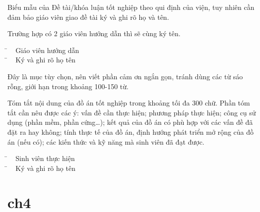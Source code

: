 \documentclass[12pt,twoside]{report}
\begin{document}
\coverpage

\begin{detai}

Biểu mẫu của Đề tài/khóa luận tốt nghiệp theo qui định của viện, tuy nhiên cần đảm bảo giáo viên giao đề tài ký và ghi rõ họ và tên.

Trường hợp có 2 giáo viên hướng dẫn thì sẽ cùng ký tên. \\
\vspace{14cm}
\begin{tabbing}
\hspace{9cm}\=\kill
 ~ \> {\large Giáo viên hướng dẫn}\\
 \hspace{9.5cm}\=\kill
 ~ \> Ký và ghi rõ họ tên
\end{tabbing} 
\end{detai}

\begin{acknowledgments}
Đây là mục tùy chọn, nên viết phần cảm ơn ngắn gọn, tránh dùng các từ sáo rỗng, giới hạn trong khoảng 100-150 từ.
\end{acknowledgments}

\begin{declaration}
Tóm tắt nội dung của đồ án tốt nghiệp trong khoảng tối đa 300 chữ. Phần tóm tắt cần nêu được các ý: vấn đề cần thực hiện; phương pháp thực hiện; công cụ sử dụng (phần mềm, phần cứng…); kết quả của đồ án có phù hợp với các vấn đề đã đặt ra hay không; tính thực tế của đồ án, định hướng phát triển mở rộng của đồ án (nếu có); các kiến thức và kỹ năng mà sinh viên đã đạt được.\\
\vspace{12cm}
\begin{tabbing}
\hspace{9cm}\=\kill
 ~ \> {\large Sinh viên thực hiện}\\
 \hspace{9.4cm}\=\kill
 ~ \> Ký và ghi rõ họ tên
\end{tabbing}
\end{declaration}

\tableofcontents
\par\vfil\null\endtitlepage
\listoffigures
\par\vfil\null\endtitlepage
\listoftables

\pagestyle{fancy}



\chapter{ch4}
\end{document}

